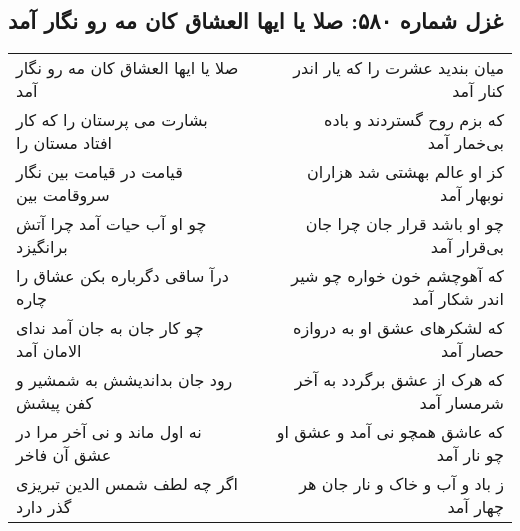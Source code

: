 \begin{center}
\section*{غزل شماره ۵۸۰: صلا یا ایها العشاق کان مه رو نگار آمد}
\label{sec:0580}
\begin{longtable}{l p{0.5cm} r}
صلا یا ایها العشاق کان مه رو نگار آمد
&&
میان بندید عشرت را که یار اندر کنار آمد
\\
بشارت می پرستان را که کار افتاد مستان را
&&
که بزم روح گستردند و باده بی‌خمار آمد
\\
قیامت در قیامت بین نگار سروقامت بین
&&
کز او عالم بهشتی شد هزاران نوبهار آمد
\\
چو او آب حیات آمد چرا آتش برانگیزد
&&
چو او باشد قرار جان چرا جان بی‌قرار آمد
\\
درآ ساقی دگرباره بکن عشاق را چاره
&&
که آهوچشم خون خواره چو شیر اندر شکار آمد
\\
چو کار جان به جان آمد ندای الامان آمد
&&
که لشکرهای عشق او به دروازه حصار آمد
\\
رود جان بداندیشش به شمشیر و کفن پیشش
&&
که هرک از عشق برگردد به آخر شرمسار آمد
\\
نه اول ماند و نی آخر مرا در عشق آن فاخر
&&
که عاشق همچو نی آمد و عشق او چو نار آمد
\\
اگر چه لطف شمس الدین تبریزی گذر دارد
&&
ز باد و آب و خاک و نار جان هر چهار آمد
\\
\end{longtable}
\end{center}
